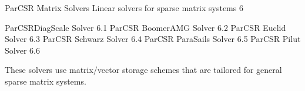 \documentclass{article}
\begin{document}
\begin{cxxentry}
{}
        {ParCSR Matrix Solvers}
        {}
        {Linear solvers for sparse matrix systems}
        {6}
\begin{cxxnames}
\cxxitem{}
        {ParCSRDiagScale Solver}
        {}
        {
}
        {6.1}
\cxxitem{}
        {ParCSR BoomerAMG Solver}
        {}
        {
}
        {6.2}
\cxxitem{}
        {ParCSR Euclid Solver}
        {}
        {
}
        {6.3}
\cxxitem{}
        {ParCSR Schwarz Solver}
        {}
        {
}
        {6.4}
\cxxitem{}
        {ParCSR ParaSails Solver}
        {}
        {
}
        {6.5}
\cxxitem{}
        {ParCSR Pilut Solver}
        {}
        {
}
        {6.6}
\end{cxxnames}
\begin{cxxdoc}


These solvers use matrix/vector storage schemes that are tailored
for general sparse matrix systems.



\end{cxxdoc}
\end{cxxentry}
\end{document}
